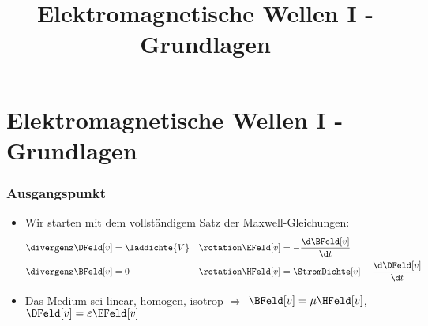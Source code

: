 
  
\title[TET: Elektromagnetische Wellen I - Grundlagen]{Elektromagnetische Wellen I - Grundlagen}


% 
% 

\maketitle

% 
% 
\section{Elektromagnetische Wellen I - Grundlagen}

\begin{frame}
  \frametitle{Ausgangspunkt}
  \begin{itemize}[<+->]
  \item Wir starten mit dem vollständigem Satz der Maxwell-Gleichungen:
\begin{align*}
\divergenz \DFeld[v] &= \laddichte{V} & \rotation \EFeld[v] &= -\frac{\d \BFeld[v]}{\d t}\\
\divergenz \BFeld[v] &= 0 & \rotation \HFeld[v] &= \StromDichte[v]+\frac{\d \DFeld[v]}{\d t} 
\end{align*}
\item Das Medium sei \alert{linear, homogen, isotrop} \(\Rightarrow\) \(\BFeld[v] = \mu \HFeld[v]\), \(\DFeld[v]=\varepsilon\EFeld[v]\)
  \end{itemize}
\end{frame}



